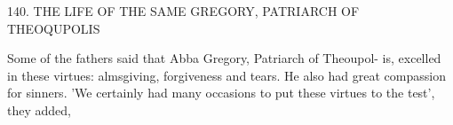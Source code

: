 140.
THE LIFE OF THE SAME GREGORY,
PATRIARCH OF THEOQUPOLIS

Some of the fathers said that Abba Gregory, Patriarch of Theoupol-
is, excelled in these virtues: almsgiving, forgiveness and tears.
He
also had great compassion for sinners.
'We certainly had many
occasions to put these virtues to the test', they added,

